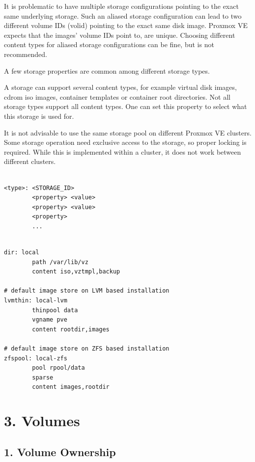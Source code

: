 It is problematic to have multiple storage configurations pointing to the exact same underlying storage. Such an aliased storage configuration can lead to two different volume IDs (volid) pointing to the exact same disk image. Proxmox VE expects that the images' volume IDs point to, are unique. Choosing different content types for aliased storage configurations can be fine, but is not recommended.

A few storage properties are common among different storage types.

A storage can support several content types, for example virtual disk images, cdrom iso images, container templates or container root directories. Not all storage types support all content types. One can set this property to select what this storage is used for.

It is not advisable to use the same storage pool on different Proxmox VE clusters. Some storage operation need exclusive access to the storage, so proper locking is required. While this is implemented within a cluster, it does not work between different clusters.

\begin{lstlisting}

<type>: <STORAGE_ID>
        <property> <value>
        <property> <value>
        <property>
        ...

\end{lstlisting}

\begin{lstlisting}

dir: local
        path /var/lib/vz
        content iso,vztmpl,backup

# default image store on LVM based installation
lvmthin: local-lvm
        thinpool data
        vgname pve
        content rootdir,images

# default image store on ZFS based installation
zfspool: local-zfs
        pool rpool/data
        sparse
        content images,rootdir

\end{lstlisting}


\section{3. Volumes}

\subsection{1. Volume Ownership}

